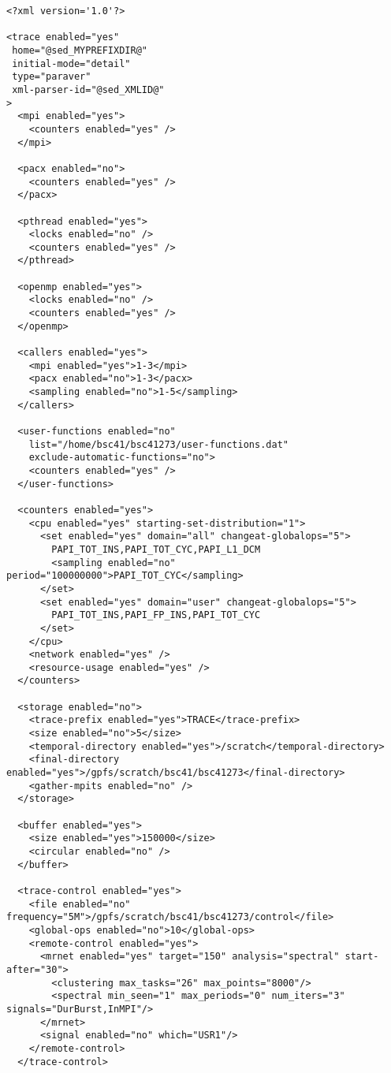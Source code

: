 \begin{verbatim}
<?xml version='1.0'?>

<trace enabled="yes"
 home="@sed_MYPREFIXDIR@"
 initial-mode="detail"
 type="paraver"
 xml-parser-id="@sed_XMLID@"
>
  <mpi enabled="yes">
    <counters enabled="yes" />
  </mpi>

  <pacx enabled="no">
    <counters enabled="yes" />
  </pacx>

  <pthread enabled="yes">
    <locks enabled="no" />
    <counters enabled="yes" />
  </pthread>

  <openmp enabled="yes">
    <locks enabled="no" />
    <counters enabled="yes" />
  </openmp>

  <callers enabled="yes">
    <mpi enabled="yes">1-3</mpi>
    <pacx enabled="no">1-3</pacx>
    <sampling enabled="no">1-5</sampling>
  </callers>

  <user-functions enabled="no"
    list="/home/bsc41/bsc41273/user-functions.dat"
    exclude-automatic-functions="no">
    <counters enabled="yes" />
  </user-functions>

  <counters enabled="yes">
    <cpu enabled="yes" starting-set-distribution="1">
      <set enabled="yes" domain="all" changeat-globalops="5">
        PAPI_TOT_INS,PAPI_TOT_CYC,PAPI_L1_DCM
        <sampling enabled="no" period="100000000">PAPI_TOT_CYC</sampling>
      </set>
      <set enabled="yes" domain="user" changeat-globalops="5">
        PAPI_TOT_INS,PAPI_FP_INS,PAPI_TOT_CYC
      </set>
    </cpu>
    <network enabled="yes" />
    <resource-usage enabled="yes" />
  </counters>

  <storage enabled="no">
    <trace-prefix enabled="yes">TRACE</trace-prefix>
    <size enabled="no">5</size>
    <temporal-directory enabled="yes">/scratch</temporal-directory>
    <final-directory enabled="yes">/gpfs/scratch/bsc41/bsc41273</final-directory>
    <gather-mpits enabled="no" />
  </storage>

  <buffer enabled="yes">
    <size enabled="yes">150000</size>
    <circular enabled="no" />
  </buffer>

  <trace-control enabled="yes">
    <file enabled="no" frequency="5M">/gpfs/scratch/bsc41/bsc41273/control</file>
    <global-ops enabled="no">10</global-ops>
    <remote-control enabled="yes">
      <mrnet enabled="yes" target="150" analysis="spectral" start-after="30">
        <clustering max_tasks="26" max_points="8000"/>
        <spectral min_seen="1" max_periods="0" num_iters="3" signals="DurBurst,InMPI"/>
      </mrnet>
      <signal enabled="no" which="USR1"/>
    </remote-control>
  </trace-control> 


\end{verbatim}
